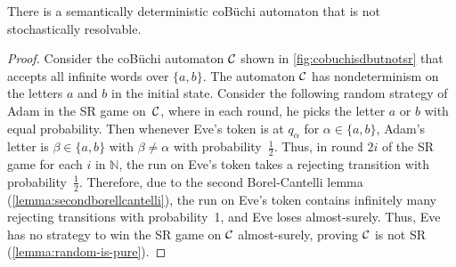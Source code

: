 \begin{lemma}
    There is a semantically deterministic coB\"uchi automaton that is not stochastically resolvable.
\end{lemma}
\begin{proof}
    Consider the coB\"uchi automaton $\mathcal{C}$ shown in \cref{fig:cobuchisdbutnotsr} that accepts all infinite words over $\{a,b\}$. The automaton $\mathcal{C}$ has nondeterminism on the letters $a$ and $b$ in the initial state.    
    Consider the following random strategy of Adam in the SR game on~$\mathcal{C}$, where in each round, he picks the letter $a$ or $b$ with equal probability. Then whenever Eve's token is at $q_{\alpha}$ for $\alpha\in\{a,b\}$, Adam's letter is $\beta \in \{a,b\}$ with $\beta\neq \alpha$ with probability~$\frac{1}{2}$. Thus, in round $2i$ of the SR game for each $i$ in $\mathbb{N}$, the run on Eve's token takes a rejecting transition with probability~$\frac{1}{2}$. Therefore, due to the second Borel-Cantelli lemma (\cref{lemma:secondborellcantelli}), the run on Eve's token contains infinitely many rejecting transitions with probability~1, and Eve loses almost-surely. Thus, Eve has no strategy to win the SR game on $\mathcal{C}$ almost-surely, proving $\mathcal{C}$ is not SR (\cref{lemma:random-is-pure}). 
\end{proof}

